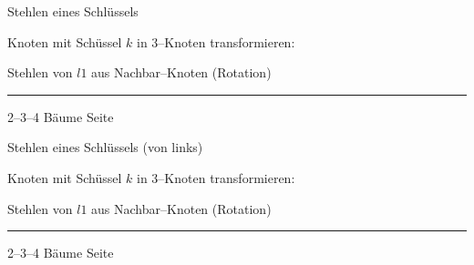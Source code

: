 \begin{slide}{}
\normalsize

\begin{center}
Stehlen eines Schl\"ussels
\end{center}
\vspace*{0.5cm}

\footnotesize

 Knoten mit Sch\"ussel $k$  in 3--Knoten transformieren:

\hspace*{1.3cm} 

Stehlen von $l1$ aus Nachbar--Knoten (Rotation)

\hspace*{1.3cm} 



\vspace*{\fill}
\tiny \addtocounter{mypage}{1}
\rule{17cm}{1mm}
2--3--4 B\"aume  \hspace*{\fill} Seite 
\end{slide}


\begin{slide}{}
\normalsize

\begin{center}
Stehlen eines Schl\"ussels (von links)
\end{center}
\vspace*{0.5cm}

\footnotesize

Knoten mit Sch\"ussel $k$  in 3--Knoten transformieren:

\hspace*{1.3cm} 

Stehlen von $l1$ aus Nachbar--Knoten (Rotation)

\hspace*{1.3cm} 



\vspace*{\fill}
\tiny \addtocounter{mypage}{1}
\rule{17cm}{1mm}
2--3--4 B\"aume  \hspace*{\fill} Seite 
\end{slide}


